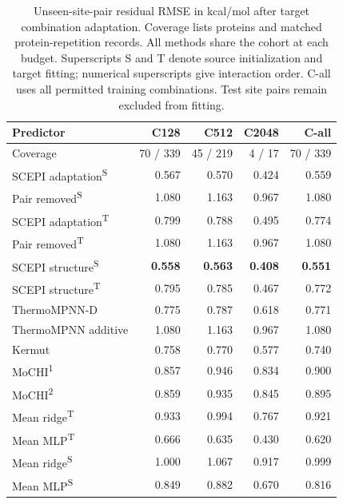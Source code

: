 \documentclass{llncs}
\begin{document}
\begin{table}[H]
\centering
\setlength{\tabcolsep}{4pt}
\caption{Unseen-site-pair residual RMSE in kcal/mol after target combination adaptation. Coverage lists proteins and matched protein-repetition records. All methods share the cohort at each budget. Superscripts S and T denote source initialization and target fitting; numerical superscripts give interaction order. C-all uses all permitted training combinations. Test site pairs remain excluded from fitting.}
\label{tab:combinationbudgets}
\begin{tabular}{lrrrr}
\toprule
Predictor & C128 & C512 & C2048 & C-all \\
\midrule
Coverage & 70 / 339 & 45 / 219 & 4 / 17 & 70 / 339 \\
\midrule
SCEPI adaptation\textsuperscript{S} & 0.567 & 0.570 & 0.424 & 0.559 \\
Pair removed\textsuperscript{S} & 1.080 & 1.163 & 0.967 & 1.080 \\
SCEPI adaptation\textsuperscript{T} & 0.799 & 0.788 & 0.495 & 0.774 \\
Pair removed\textsuperscript{T} & 1.080 & 1.163 & 0.967 & 1.080 \\
SCEPI structure\textsuperscript{S} & \textbf{0.558} & \textbf{0.563} & \textbf{0.408} & \textbf{0.551} \\
SCEPI structure\textsuperscript{T} & 0.795 & 0.785 & 0.467 & 0.772 \\
ThermoMPNN-D & 0.775 & 0.787 & 0.618 & 0.771 \\
ThermoMPNN additive & 1.080 & 1.163 & 0.967 & 1.080 \\
Kermut & 0.758 & 0.770 & 0.577 & 0.740 \\
MoCHI\textsuperscript{1} & 0.857 & 0.946 & 0.834 & 0.900 \\
MoCHI\textsuperscript{2} & 0.859 & 0.935 & 0.845 & 0.895 \\
Mean ridge\textsuperscript{T} & 0.933 & 0.994 & 0.767 & 0.921 \\
Mean MLP\textsuperscript{T} & 0.666 & 0.635 & 0.430 & 0.620 \\
Mean ridge\textsuperscript{S} & 1.000 & 1.067 & 0.917 & 0.999 \\
Mean MLP\textsuperscript{S} & 0.849 & 0.882 & 0.670 & 0.816 \\
\bottomrule
\end{tabular}
\end{table}
\end{document}
